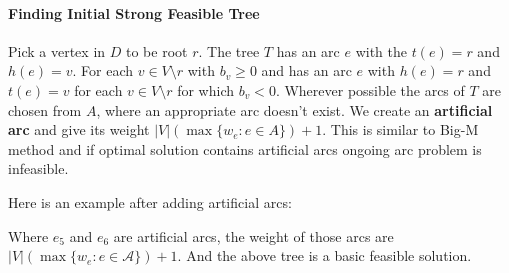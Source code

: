                \paragraph{Finding Initial Strong Feasible Tree}
                    Pick a vertex in $D$ to be root $r$. The tree $T$ has an arc $e$ with the $t(e) = r$ and $h(e) = v$. For each $v\in V\setminus r$ with $b_v \ge 0$ and has an arc $e$ with $h(e) = r$ and $t(e) = v$ for each $v \in V\setminus r$ for which $b_v < 0$. Wherever possible the arcs of $T$ are chosen from $A$, where an appropriate arc doesn't exist. We create an \textbf{artificial arc} and give its weight $|V|(\max\{w_e: e\in A\}) + 1$. This is similar to Big-M method and if optimal solution contains artificial arcs ongoing arc problem is infeasible.

                    Here is an example after adding artificial arcs:

                    \begin{figure}[H]
                        \centering
                    \end{figure}

                    Where $e_5$ and $e_6$ are artificial arcs, the weight of those arcs are $|V|(\max\{w_e: e\in \mathcal{A}\}) + 1$. And the above tree is a basic feasible solution.

